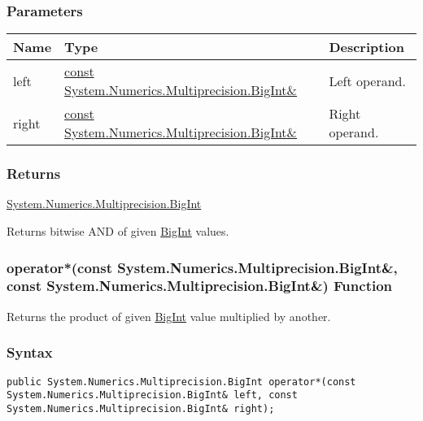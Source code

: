 \documentclass[a4paper,oneside,11.000000pt]{book}
\begin{document}
\subsubsection*{Parameters}
\begin{flushleft}
\begin{supertabular}[l]{!{\raggedright}p{1.30721cm}!{\raggedright}p{8.55945cm}!{\raggedright}p{3.66839cm}}
\textbf{Name}
& \textbf{Type}
& \textbf{Description}
\\
\hline
left
& \hyperlink{System.Numerics.Multiprecision.BigInt}{const System.\-Numerics.\-Multiprecision.\-BigInt\&\-}
& Left operand.

\\
right
& \hyperlink{System.Numerics.Multiprecision.BigInt}{const System.\-Numerics.\-Multiprecision.\-BigInt\&\-}
& Right operand.

\\
\end{supertabular}

\end{flushleft}
\subsubsection*{Returns}
\hyperlink{System.Numerics.Multiprecision.BigInt}{System.\-Numerics.\-Multiprecision.\-BigInt}
\begin{flushleft}
Returns bitwise AND of given \hyperlink{System.Numerics.Multiprecision.BigInt}{BigInt} values.

\end{flushleft}
\clearpage

\hypertarget{System.Numerics.Multiprecision.operator.times.C.R.System.Numerics.Multiprecision.BigInt.C.R.System.Numerics.Multiprecision.BigInt}{\subsubsection*{operator*(const System.Numerics.Multiprecision.BigInt\&, const System.Numerics.Multiprecision.BigInt\&) Function}}
\begin{flushleft}
Returns the product of given \hyperlink{System.Numerics.Multiprecision.BigInt}{BigInt} value multiplied by another.

\end{flushleft}
\subsubsection*{Syntax}
\texttt{public System.Numerics.Multiprecision.BigInt operator*(const System.Numerics.Multiprecision.BigInt\& left, const System.Numerics.Multiprecision.BigInt\& right);}
\end{document}
